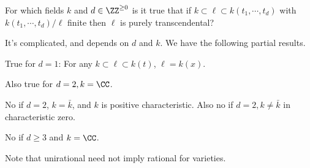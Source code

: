\begin{question}

For which fields \(k\) and \(d\in \ZZ^{\geq 0}\) is it true that if
\(k \subset \ell \subset k(t_1, \cdots, t_d)\) with
\(k(t_1 ,\cdots, t_d)/\ell\) finite then \(\ell\) is purely
transcendental?

\end{question}

\begin{answer}

It's complicated, and depends on \(d\) and \(k\). We have the following
partial results.

\end{answer}

\begin{theorem}[Lüroth]

True for \(d=1\): For any \(k\subset \ell \subset k(t)\),
\(\ell = k(x)\).

\end{theorem}

\begin{theorem}[Castelnuovo]

Also true for \(d=2, k=\CC\).

\end{theorem}

\begin{theorem}[Zariski]

No if \(d= 2\), \(k=\bar k\), and \(k\) is positive characteristic. Also
no if \(d=2, k\neq \bar k\) in characteristic zero.

\end{theorem}

\begin{theorem}

No if \(d\geq 3\) and \(k= \CC\).

\end{theorem}

\begin{remark}

Note that unirational need not imply rational for varieties.

\end{remark}

